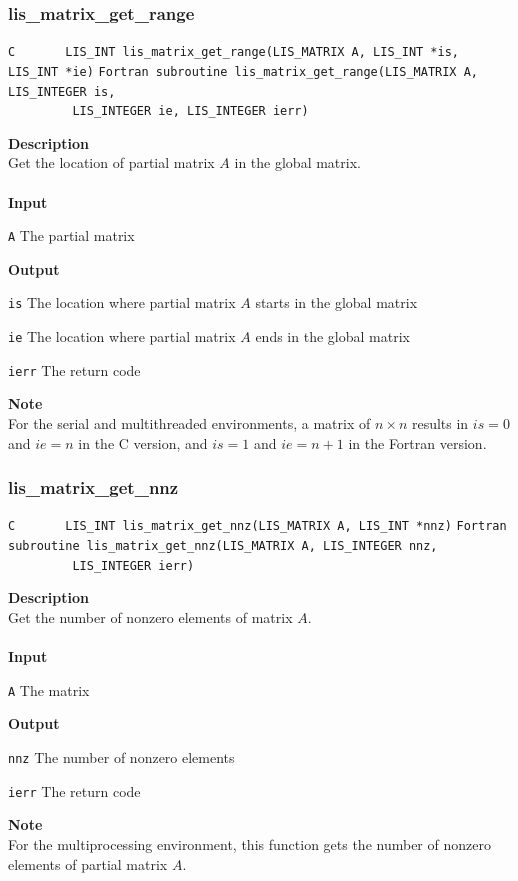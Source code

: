 \documentclass[a4paper]{article}
\newcommand{\namelistlabel}[1]{\mbox{#1}\hfill}
\newenvironment{namelist}[1]{%
\begin{list}{}
  {\let\makelabel\namelistlabel
  \settowidth{\labelwidth}{#1}
  \setlength{\leftmargin}{1.1\labelwidth}}
  }{%
\end{list}}
\begin{document}
\subsubsection{lis\_matrix\_get\_range}
\begin{screen}
\verb|C       LIS_INT lis_matrix_get_range(LIS_MATRIX A, LIS_INT *is, LIS_INT *ie)|
\verb|Fortran subroutine lis_matrix_get_range(LIS_MATRIX A, LIS_INTEGER is,|\\
\verb|         LIS_INTEGER ie, LIS_INTEGER ierr)|
\end{screen}
{\bf Description}\\
\indent
Get the location of partial matrix $A$ in the global matrix.
\\ \\
\noindent
{\bf Input}
\begin{namelist}{XXXXXXXXXXXXXXXXXXXX}
\item[\tt A] The partial matrix
\end{namelist}
{\bf Output}
\begin{namelist}{XXXXXXXXXXXXXXXXXXXX}
\item[\tt is] The location where partial matrix $A$ starts in the global matrix
\item[\tt ie] The location where partial matrix $A$ ends in the global matrix
\item[\tt ierr] The return code
\end{namelist}
{\bf Note}\\
\indent
For the serial and multithreaded environments, a matrix of $n \times n$ results in $is = 0$ and $ie = n$ in the C version, and $is = 1$ and $ie = n+1$ in the Fortran version.


\subsubsection{lis\_matrix\_get\_nnz}
\begin{screen}
\verb|C       LIS_INT lis_matrix_get_nnz(LIS_MATRIX A, LIS_INT *nnz)|
\verb|Fortran subroutine lis_matrix_get_nnz(LIS_MATRIX A, LIS_INTEGER nnz,|\\
\verb|         LIS_INTEGER ierr)|
\end{screen}
{\bf Description}\\
\indent
Get the number of nonzero elements of matrix $A$.
\\ \\
\noindent
{\bf Input}
\begin{namelist}{XXXXXXXXXXXXXXXXXXXX}
\item[\tt A] The matrix
\end{namelist}
{\bf Output}
\begin{namelist}{XXXXXXXXXXXXXXXXXXXX}
\item[\tt nnz] The number of nonzero elements
\item[\tt ierr] The return code
\end{namelist}
{\bf Note}\\
\indent
For the multiprocessing environment, this function gets  
the number of nonzero elements of partial matrix $A$. 
\end{document}
